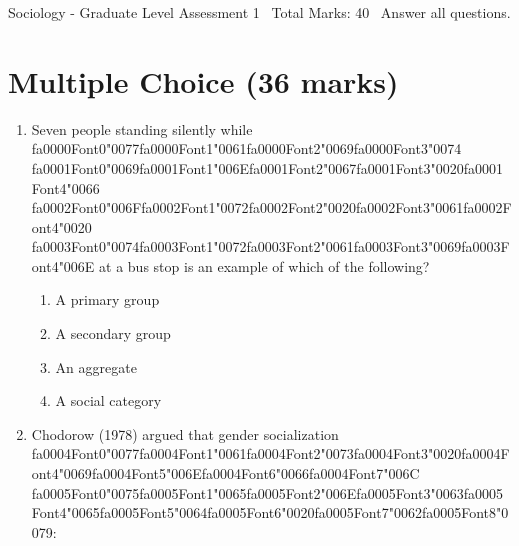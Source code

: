 \documentclass[12pt]{article}
\begin{document}
\begin{center}
Sociology - Graduate Level Assessment 1 \
Total Marks: 40 \
Answer all questions.
\end{center}

\section*{Multiple Choice (36 marks)}
\begin{enumerate}[label=\arabic*.]
\item Seven people standing silently while {\csname fa0000Font0\endcsname\char"0077}{\csname fa0000Font1\endcsname\char"0061}{\csname fa0000Font2\endcsname\char"0069}{\csname fa0000Font3\endcsname\char"0074} {\csname fa0001Font0\endcsname\char"0069}{\csname fa0001Font1\endcsname\char"006E}{\csname fa0001Font2\endcsname\char"0067}{\csname fa0001Font3\endcsname\char"0020}{\csname fa0001Font4\endcsname\char"0066} {\csname fa0002Font0\endcsname\char"006F}{\csname fa0002Font1\endcsname\char"0072}{\csname fa0002Font2\endcsname\char"0020}{\csname fa0002Font3\endcsname\char"0061}{\csname fa0002Font4\endcsname\char"0020} {\csname fa0003Font0\endcsname\char"0074}{\csname fa0003Font1\endcsname\char"0072}{\csname fa0003Font2\endcsname\char"0061}{\csname fa0003Font3\endcsname\char"0069}{\csname fa0003Font4\endcsname\char"006E} at a bus stop is an example of which of the following?
\begin{enumerate}[label=(\alph*)]
    \item A primary group
    \item A secondary group
    \item An aggregate
    \item A social category
\end{enumerate}
\item Chodorow (1978) argued that gender socialization {\csname fa0004Font0\endcsname\char"0077}{\csname fa0004Font1\endcsname\char"0061}{\csname fa0004Font2\endcsname\char"0073}{\csname fa0004Font3\endcsname\char"0020}{\csname fa0004Font4\endcsname\char"0069}{\csname fa0004Font5\endcsname\char"006E}{\csname fa0004Font6\endcsname\char"0066}{\csname fa0004Font7\endcsname\char"006C} {\csname fa0005Font0\endcsname\char"0075}{\csname fa0005Font1\endcsname\char"0065}{\csname fa0005Font2\endcsname\char"006E}{\csname fa0005Font3\endcsname\char"0063}{\csname fa0005Font4\endcsname\char"0065}{\csname fa0005Font5\endcsname\char"0064}{\csname fa0005Font6\endcsname\char"0020}{\csname fa0005Font7\endcsname\char"0062}{\csname fa0005Font8\endcsname\char"0079}:

\end{enumerate}
\end{document}
